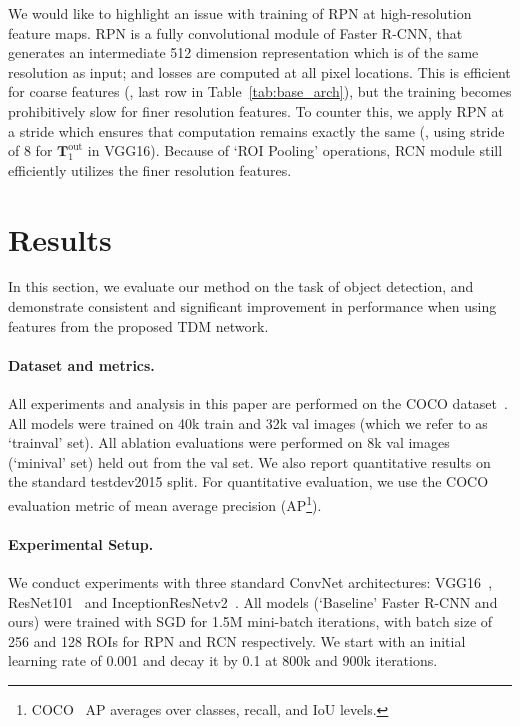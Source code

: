 \documentclass[10pt,twocolumn,letterpaper]{article}
\newcommand{\trainval}{trainval\raisebox{0.2ex}{$\ast$}}
\newcommand{\minival}{minival\raisebox{0.2ex}{$\ast$}}
\begin{document}
We would like to highlight an issue with training of RPN at high-resolution feature maps. RPN is a fully convolutional module of Faster R-CNN, that generates an intermediate 512 dimension representation which is of the same resolution as input; and losses are computed at all pixel locations. This is efficient for coarse features (\eg, last row in Table~\ref{tab:base_arch}), but the training becomes prohibitively slow for finer resolution features. To counter this, we apply RPN at a stride which ensures that computation remains exactly the same (\eg, using stride of 8 for $\mathbf{T}^\text{out}_{1}$ in VGG16). Because of `ROI Pooling' operations, RCN module still efficiently utilizes the finer resolution features.

\vspace{-0.01in}
\section{Results}\label{sec:results}
\vspace{-0.01in}

In this section, we evaluate our method on the task of object detection, and demonstrate consistent and significant improvement in performance when using features from the proposed TDM network.

\vspace{-0.1in}
\paragraph{Dataset and metrics.} All experiments and analysis in this paper are performed on the COCO dataset~\cite{lin2014coco}. All models were trained on 40k train and 32k val images (which we refer to as `\trainval' set). All ablation evaluations were performed on 8k val images (`\minival' set) held out from the val set. We also report quantitative results on the standard testdev2015 split. For quantitative evaluation, we use the COCO evaluation metric of mean average precision (AP\footnote{COCO~\cite{lin2014coco} AP averages over classes, recall, and IoU levels.}). 

\vspace{-0.1in}
\paragraph{Experimental Setup.} We conduct experiments with three standard ConvNet architectures: VGG16~\cite{VGG}, ResNet101~\cite{resnet} and InceptionResNetv2~\cite{szegedy2016inception}. All models (`Baseline' Faster R-CNN and ours) were trained with SGD for 1.5M mini-batch iterations, with batch size of 256 and 128 ROIs for RPN and RCN respectively. We start with an initial learning rate of 0.001 and decay it by 0.1 at 800k and 900k iterations. 
\end{document}
